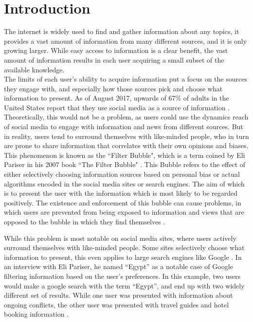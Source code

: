\chapter{Introduction}
The internet is widely used to find and gather information about any topics, it
provides a vast amount of information from many different sources, and it is
only growing larger.
While easy access to information is a clear benefit, the vast amount of
information results in each user acquiring a small subset of the available
knowledge.\\
The limits of each user's ability to acquire information put a focus on the
sources they engage with, and especially how those sources pick and choose what
information to present.
As of August 2017, upwards of 67\% of adults in the United States report that
they use social media as a source of information \citep{journalism2017}.
Theoretically, this would not be a problem, as users could use the dynamics
reach of social media to engage with information and news from different sources.
But in reality, users tend to surround themselves with like-minded people, who
in turn are prone to share information that correlates with their own opinions
and biases.\\

This phenomenon is known as the ``Filter Bubble", which is a term coined by Eli
Pariser in his 2007 book ``The Filter Bubble" \citep{pariser2011filter}.
This Bubble refers to the effect of either selectively choosing information
sources based on personal bias or actual algorithms encoded in the social media
sites or search engines.
The aim of which is to present the user with the information which is most
likely to be regarded positively.
The existence and enforcement of this bubble can cause problems, in which users
are prevented from being exposed to information and views that are opposed to
the bubble in which they find themselves
\citep[p.59-73]{pariser2011filter}.\nl

While this problem is most notable on social media sites, where users actively
surround themselves with like-minded people. Some sites
selectively choose what information to present, this even applies to large
search engines like Google 
\BadSource.
In an interview with Eli Pariser, he named ``Egypt'' as a notable case of Google
filtering information based on the user's preferences.
In this example, two users would make a google search with the term ``Egypt'',
and end up with two widely different set of results.
While one user was presented with information about ongoing conflicts, the other
user was presented with travel guides and hotel booking information
\citep{nusSduSearch}.